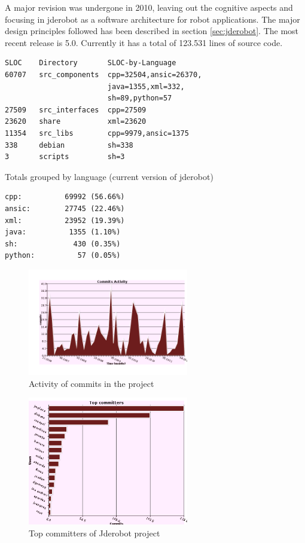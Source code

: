 \documentclass[twocolumn]{svjour3}          %
\begin{document}
A major revision was undergone in 2010, leaving out the cognitive aspects and focusing in jderobot as a software architecture for robot applications. The major design principles followed has been described in section \ref{sec:jderobot}. The most recent release is 5.0. Currently it has a total of 123.531 lines of source code.

\begin{verbatim}
SLOC    Directory       SLOC-by-Language 
60707   src_components  cpp=32504,ansic=26370,
                        java=1355,xml=332,
                        sh=89,python=57
27509   src_interfaces  cpp=27509
23620   share           xml=23620
11354   src_libs        cpp=9979,ansic=1375
338     debian          sh=338
3       scripts         sh=3
\end{verbatim}

Totals grouped by language (current version of jderobot)
\begin{verbatim}
cpp:          69992 (56.66%)
ansic:        27745 (22.46%)
xml:          23952 (19.39%)
java:          1355 (1.10%)
sh:             430 (0.35%)
python:          57 (0.05%)
\end{verbatim}


\begin{figure}
  \includegraphics[width=7cm]{figs/svn_activity.png}
\caption{Activity of commits in the project}
\label{fig:svn-activity}
\end{figure}

\begin{figure}
  \includegraphics[width=7cm]{figs/svn_top-committers.png}
\caption{Top committers of Jderobot project}
\label{fig:svn-topcommiters}
\end{figure}
\end{document}

